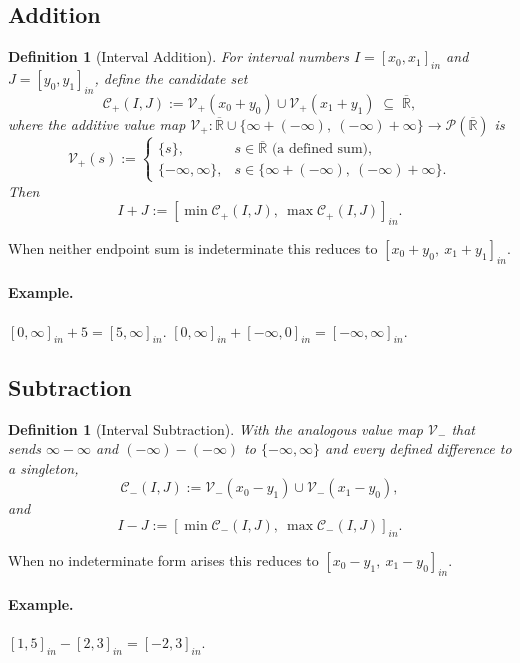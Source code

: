 \documentclass[11pt,a4paper]{article}
\theoremstyle{paperdef}
\newtheorem{definition}[theorem]{Definition}
\newcommand{\Rext}{\overline{\mathbb{R}}}
\newcommand{\inI}[1]{[#1]_{in}}
\newcommand{\V}{\mathcal{V}}
\newcommand{\Cand}{\mathcal{C}}
\begin{document}
\subsection{Addition}\label{sec:addition}

\begin{definition}[Interval Addition]\label{def:addition}
For interval numbers $I = \inI{x_0, x_1}$ and $J = \inI{y_0, y_1}$,
define the candidate set
\[
\Cand_{+}(I, J) := \V_{+}(x_0 + y_0) \cup \V_{+}(x_1 + y_1)
\;\subseteq\; \Rext,
\]
where the additive value map
$\V_{+}: \Rext \cup \{\infty + (-\infty),\ (-\infty) + \infty\}
\to \mathcal{P}(\Rext)$ is
\[
\V_{+}(s) := \begin{cases}
\{s\}, & s \in \Rext \text{ (a defined sum)}, \\
\{-\infty, \infty\}, & s \in \{\infty + (-\infty),\ (-\infty) + \infty\}.
\end{cases}
\]
Then
\[
I + J := \inI{\min \Cand_{+}(I, J),\ \max \Cand_{+}(I, J)}.
\]
\end{definition}

When neither endpoint sum is indeterminate this reduces to
$\inI{x_0 + y_0,\ x_1 + y_1}$.

\paragraph{Example.} $\inI{0, \infty} + 5 = \inI{5, \infty}$.
$\inI{0, \infty} + \inI{-\infty, 0} = \inI{-\infty, \infty}$.

\subsection{Subtraction}\label{sec:subtraction}

\begin{definition}[Interval Subtraction]\label{def:subtraction}
With the analogous value map $\V_{-}$ that sends $\infty - \infty$
and $(-\infty) - (-\infty)$ to $\{-\infty, \infty\}$ and every defined
difference to a singleton,
\[
\Cand_{-}(I, J) := \V_{-}(x_0 - y_1) \cup \V_{-}(x_1 - y_0),
\]
and
\[
I - J := \inI{\min \Cand_{-}(I, J),\ \max \Cand_{-}(I, J)}.
\]
\end{definition}

When no indeterminate form arises this reduces to
$\inI{x_0 - y_1,\ x_1 - y_0}$.

\paragraph{Example.} $\inI{1, 5} - \inI{2, 3} = \inI{-2, 3}$.
\end{document}
